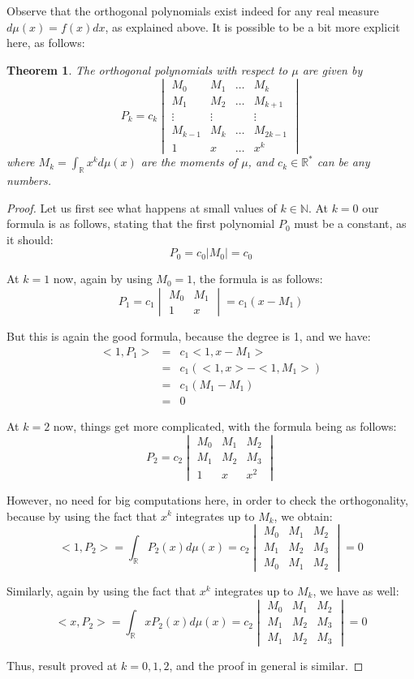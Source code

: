 \documentclass[12pt]{amsbook}
\newtheorem{theorem}{Theorem}[chapter]
\begin{document}
Observe that the orthogonal polynomials exist indeed for any real measure $d\mu(x)=f(x)dx$, as explained above. It is possible to be a bit more explicit here, as follows:


\begin{theorem}
The orthogonal polynomials with respect to $\mu$ are given by
$$P_k=c_k\begin{vmatrix}
M_0&M_1&\ldots&M_k\\
M_1&M_2&\ldots&M_{k+1}\\
\vdots&\vdots&&\vdots\\
M_{k-1}&M_k&\ldots&M_{2k-1}\\
1&x&\ldots&x^k
\end{vmatrix}$$
where $M_k=\int_\mathbb Rx^kd\mu(x)$ are the moments of $\mu$, and $c_k\in\mathbb R^*$ can be any numbers.
\end{theorem}

\begin{proof}
Let us first see what happens at small values of $k\in\mathbb N$. At $k=0$ our formula is as follows, stating that the first polynomial $P_0$ must be a constant, as it should:
$$P_0=c_0|M_0|=c_0$$

At $k=1$ now, again by using $M_0=1$, the formula is as follows:
$$P_1=c_1\begin{vmatrix}M_0&M_1\\ 1&x\end{vmatrix}=c_1(x-M_1)$$

But this is again the good formula, because the degree is 1, and we have:
\begin{eqnarray*}
<1,P_1>
&=&c_1<1,x-M_1>\\
&=&c_1(<1,x>-<1,M_1>)\\
&=&c_1(M_1-M_1)\\
&=&0
\end{eqnarray*}

At $k=2$ now, things get more complicated, with the formula being as follows:
$$P_2=c_2\begin{vmatrix}
M_0&M_1&M_2\\
M_1&M_2&M_3\\
1&x&x^2
\end{vmatrix}$$

However, no need for big computations here, in order to check the orthogonality, because by using the fact that $x^k$ integrates up to $M_k$, we obtain:
$$<1,P_2>=\int_\mathbb RP_2(x)d\mu(x)=c_2\begin{vmatrix}
M_0&M_1&M_2\\
M_1&M_2&M_3\\
M_0&M_1&M_2
\end{vmatrix}=0$$

Similarly, again by using the fact that $x^k$ integrates up to $M_k$, we have as well:
$$<x,P_2>=\int_\mathbb RxP_2(x)d\mu(x)=c_2\begin{vmatrix}
M_0&M_1&M_2\\
M_1&M_2&M_3\\
M_1&M_2&M_3
\end{vmatrix}=0$$

Thus, result proved at $k=0,1,2$, and the proof in general is similar.
\end{proof}
\end{document}
